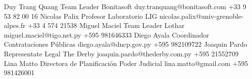 
\begin{referees}

  {Duy Trang Quang}
  {Team Leader}
  {Bonitasoft}
  {duy.tranquang@bonitasoft.com}
  {+33 9 53 82 00 16}
  {Nicolas Palix}
  {Profesor}
  {Laboratorio LIG}
  {nicolas.palix@univ-grenoble-alpes.fr}
  {+33 4 574 21538}
  {Miguel Maciel}
  {Team Leader}
  {Lothar}
  {miguel.maciel@tigo.net.py}
  {+595 981646333}
  {Diego Ayala}
  {Coordinador}
  {Contrataciones Públicas}
  {diego.ayala@dncp.gov.py}
  {+595 982109722}
  {Joaquin Pardo}
  {Representate Legal}
  {The Derby}
  {joaquin.pardo@thederby.com.py}
  {+595 21552709}
  {Lina Matto}
  {Directora de Planificación}
  {Poder Judicial}
  {lina.matto@gmail.com}
  {+595 981426001}

\end{referees}
